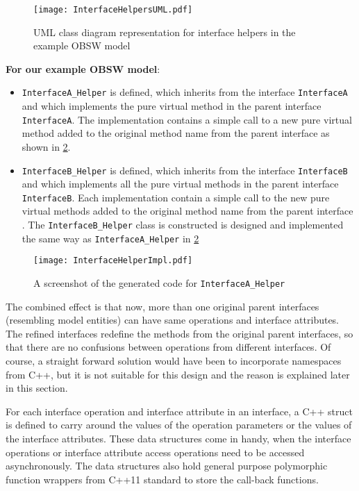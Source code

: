 \begin{figure}[h]
	\centering
	\texttt{[image: InterfaceHelpersUML.pdf]}
	\caption{UML class diagram representation for interface helpers in the example OBSW model}
	\label{fig: Interface helpers UML}
\end{figure}

\textbf{For our example OBSW model}:
\begin{itemize}
\item \texttt{InterfaceA\allowbreak\_Helper} is defined, which inherits from the interface \texttt{InterfaceA} and which implements the pure virtual method in the parent interface \texttt{InterfaceA}. The implementation contains a simple call to a new pure virtual method added to the original method name from the parent interface as shown in \cref{fig: Interface helper Impl}.

\item \texttt{InterfaceB\allowbreak\_Helper} is defined, which inherits from the interface \texttt{InterfaceB} and which implements all the pure virtual methods in the parent interface \texttt{InterfaceB}. Each implementation contain a simple call to the new pure virtual methods added to the original method name from the parent interface . The \texttt{InterfaceB\allowbreak\_Helper} class is constructed is designed and implemented the same way as \texttt{InterfaceA\allowbreak\_Helper} in \cref{fig: Interface helper Impl}    
\end{itemize}

\begin{figure}[h]
	\centering
	\texttt{[image: InterfaceHelperImpl.pdf]}
	\caption{A screenshot of the generated code for \texttt{InterfaceA\allowbreak\_Helper}}
	\label{fig: Interface helper Impl}
\end{figure}

The combined effect is that now, more than one original parent interfaces (resembling model entities) can have same operations and interface attributes. The refined interfaces redefine the methods from the original parent interfaces, so that there are no confusions between operations from different interfaces. Of course, a straight forward solution would have been to incorporate namespaces from C++, but it is not suitable for this design and the reason is explained later in this section. 

For each interface operation and interface attribute in an interface, a C++ struct is defined to carry around the values of the operation parameters or the values of the interface attributes. These data structures come in handy, when the interface operations or interface attribute access operations need to be accessed asynchronously. The data structures also hold general purpose polymorphic function wrappers from C++11 standard to store the call-back functions. 

